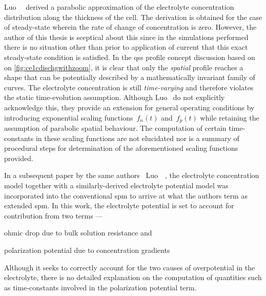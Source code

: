 Luo~\etal~\cite{Luo2013} derived  a parabolic  approximation of  the electrolyte
concentration  distribution along  the  thickness of  the  cell. The  derivation
is  obtained  for  the case  of  steady-state  wherein  the  rate of  change  of
concentration  is  zero.  However,  the  author  of  this  thesis  is  sceptical
about  this since  in  the simulations  performed there  is  no situation  other
than  prior to  application of  current that  this exact  steady-state condition
is  satisfied.  In  the  \gls{qss}   profile  concept  discussion  based  on  on
\cref{fig:ce1cdischgwithzoom}, it is clear  that only the \emph{spatial} profile
reaches a shape that can be  potentially described by a mathematically invariant
family of curves. The electrolyte concentration is still \emph{time-varying} and
therefore violates the static time-evolution assumption. Although Luo~\etal{} do
not explicitly acknowledge this, they provide an extension for general operating
conditions  by introducing  exponential scaling  functions~$f_n(t)$ and~$f_p(t)$
while retaining the  assumption of parabolic spatial  behaviour. The computation
of certain time-constants in these scaling functions are not elucidated nor is a
summary  of procedural  steps for  determination of  the aforementioned  scaling
functions provided.


In a subsequent paper by  the same authors \ie~Luo~\etal~\cite{Luo2013a}, the
electrolyte concentration  model together  with a  similarly-derived electrolyte
potential model  was incorporated into  the conventional \gls{spm} to  arrive at
what the authors term as extended \gls{spm}. In this work, the electrolyte
potential is set to account for contribution from two terms ---
\begin{enumerate*}[label=\emph{\alph*})]
    \item ohmic drop due to bulk solution resistance and
    \item polarization potential due to concentration gradients
\end{enumerate*}
Although it  seeks to correctly account  for the two causes  of overpotential in
the  electrolyte,  there  is  no  detailed explanation  on  the  computation  of
quantities such as time-constants involved in the polarization potential term.

